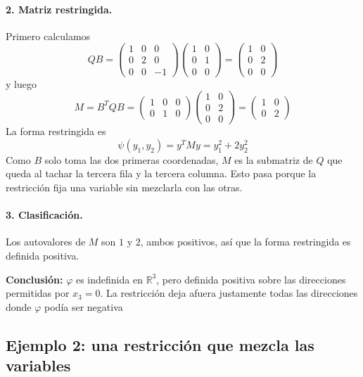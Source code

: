 \documentclass{article}
\begin{document}
\paragraph*{2. Matriz restringida.}
Primero calculamos
\[
QB=
\begin{pmatrix}
1 & 0 & 0\\
0 & 2 & 0\\
0 & 0 & -1
\end{pmatrix}
\begin{pmatrix}
1 & 0\\
0 & 1\\
0 & 0
\end{pmatrix}
=
\begin{pmatrix}
1 & 0\\
0 & 2\\
0 & 0
\end{pmatrix}
\]
y luego
\[
M=B^TQB=
\begin{pmatrix}
1 & 0 & 0\\
0 & 1 & 0
\end{pmatrix}
\begin{pmatrix}
1 & 0\\
0 & 2\\
0 & 0
\end{pmatrix}
=
\begin{pmatrix}
1 & 0\\
0 & 2
\end{pmatrix}
\]
La forma restringida es
\[
\psi(y_1,y_2)=y^TMy=y_1^2+2y_2^2
\]
Como \(B\) solo toma las dos primeras coordenadas, \(M\) es la submatriz de \(Q\) que queda al tachar la tercera fila y la tercera columna. Esto pasa porque la restricción fija una variable sin mezclarla con las otras.

\paragraph*{3. Clasificación.}
Los autovalores de \(M\) son \(1\) y \(2\), ambos positivos, así que la forma restringida es definida positiva.

{\color{teal}
\textbf{Conclusión:} \(\varphi\) es indefinida en \(\mathbb{R}^3\), pero definida positiva sobre las direcciones permitidas por \(x_3=0\). La restricción deja afuera justamente todas las direcciones donde \(\varphi\) podía ser negativa}


\subsection*{Ejemplo 2: una restricción que mezcla las variables}
\end{document}
